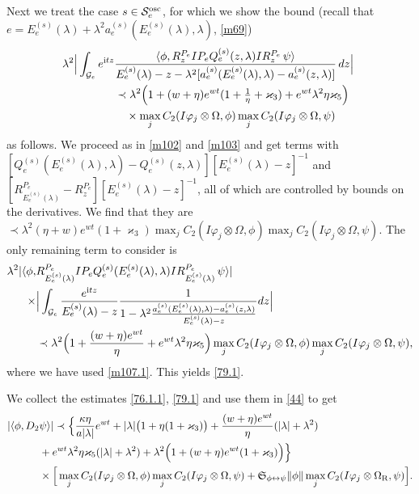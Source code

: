\documentclass[letterpaper,onecolumn,11pt,accepted=2021-12-09]{quantumarticle}
\numberwithin{equation}{section}
\newcommand{\sym}{ {\mathfrak S}_{\phi\leftrightarrow\psi}}
\newcommand{\aes}{a_e^{(s)}}
\newcommand{\Qes}{Q_e^{(s)}}
\newcommand{\Ees}{E_e^{(s)}(\lambda)}
\renewcommand{\r}{{\rm R}}
\renewcommand{\i}{{\rm i}}
\begin{document}
Next we treat the case $s\in{\mathcal S}_e^{\rm osc}$, for which we show the bound (recall that  $e=E_e^{(s)}(\lambda)+\lambda^2a_e^{(s)}(E_e^{(s)}(\lambda),\lambda)$, \eqref{m69})
\begin{align}
\lambda^2 \Big| \int_{{\mathcal G}_e} e^{\i tz} & \frac{\langle \phi,   R^{P_e}_z I P_e\Qes(z,\lambda) I R_z^{P_e} \,    \psi \rangle}{E_e^{(s)}(\lambda)-z-\lambda^2[\aes(\Ees,\lambda) -\aes(z,\lambda)]} \, dz\Big|\nonumber\\
& \prec  \lambda^2 \Big( 1+ (w+\eta) e^{wt}(1+\tfrac1\eta +\varkappa_3) + e^{wt}\lambda^2\eta\varkappa_5\Big) \nonumber\\
&\quad \times \max_j C_2(I\varphi_j\otimes\Omega,\phi) \max_j C_2(I\varphi_j\otimes\Omega,\psi)
\qquad
\label{79.1}
\end{align}
as follows. We proceed  as in \eqref{m102} and \eqref{m103} and get terms with $[\Qes(\Ees,\lambda)-\Qes(z,\lambda)][\Ees-z]^{-1}$ and $[R_{\Ees}^{P_e}-R_z^{P_e}][\Ees-z]^{-1}$, all of which are controlled by bounds on the derivatives. We find that they are $\prec \lambda^2(\eta+w)e^{wt}(1+\varkappa_3)\max_j C_2(I\varphi_j\otimes\Omega,\phi) \max_j C_2(I\varphi_j\otimes\Omega,\psi)$. The only remaining term to consider is 
\begin{align}
\lambda^2 |\langle \phi,  &  R^{P_e}_{\Ees} I P_e \Qes(\Ees, \lambda) I R_{\Ees}^{P_e} \,    \psi \rangle| \nonumber\\
\times  &\Big| \int_{{\mathcal G}_e} \frac{e^{\i t z}}{\Ees-z}\frac{1}{1-\lambda^2\frac{\aes(\Ees,\lambda) - \aes(z,\lambda)}{\Ees -z}} dz\Big| \nonumber\\
&\prec \lambda^2 \Big( 1+ \frac{(w+\eta) e^{wt}}{\eta}+ e^{wt}\lambda^2\eta\varkappa_5\Big)\max_j C_2(I\varphi_j\otimes\Omega,\phi) \max_j C_2(I\varphi_j\otimes\Omega,\psi),
\end{align}
where we have used \eqref{m107.1}. This yields \eqref{79.1}. 
\medskip

We collect the estimates \eqref{76.1.1}, \eqref{79.1} and use them in \eqref{44} to get 
\begin{align}
|\langle \phi, D_2 & \psi\rangle| \prec  \Big\{ 
 \frac{\kappa\eta}{a|\lambda|} e^{wt} + |\lambda|\big( 1 +\eta(1+\varkappa_3)\big)+ \frac{(w+\eta) e^{wt}}{\eta} ( |\lambda| +\lambda^2)\nonumber\\
& +e^{wt}\lambda^2\eta\varkappa_5(|\lambda|+\lambda^2)+ \lambda^2 \Big( 1+ (w+\eta) e^{wt}(1+\varkappa_3)  \Big)\Big\} \nonumber\\
& \times\Big[\max_j C_2(I\varphi_j\otimes\Omega,\phi) \max_j C_2(I\varphi_j\otimes\Omega,\psi)+  \sym \|\phi\| \max_jC_2(I\varphi_j\otimes\Omega_\r, \psi) \Big]. 
\label{82}
\end{align}
\end{document}
